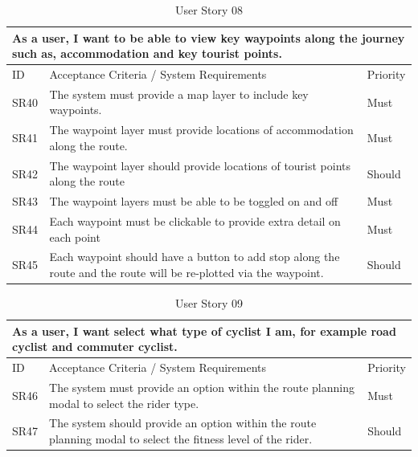 \begin{table}[!htb]
  \caption{User Story 08}
  \label{tab:user-story-08}
  \begin{tabular}{ m{1cm} m{11cm} m{1cm} }
  \hline
  \multicolumn{3}{p{13cm}}{As a user, I want to be able to view key waypoints along the journey such as, accommodation and key tourist points.}\\ 
  \hline
  ID & Acceptance Criteria / System Requirements & Priority\\
  \hline
  \label{SR:40}SR40 & The system must provide a map layer to include key waypoints. & Must \\
  \label{SR:41}SR41 & The waypoint layer must provide locations of accommodation along the route. & Must\\
  \label{SR:42}SR42 & The waypoint layer should provide locations of tourist points along the route & Should\\
  \label{SR:43}SR43 & The waypoint layers must be able to be toggled on and off & Must\\
  \label{SR:44}SR44 & Each waypoint must be clickable to provide extra detail on each point & Must\\
  \label{SR:45} SR45 & Each waypoint should have a button to add stop along the route and the route will be re-plotted via the waypoint. & Should\\
  \hline
  \end{tabular}
\end{table}

\begin{table}[!htb]
  \caption{User Story 09}
  \label{tab:user-story-09}
  \begin{tabular}{ m{1cm} m{11cm} m{1cm} }
  \hline
  \multicolumn{3}{p{13cm}}{As a user, I want select what type of cyclist I am, for example road cyclist and commuter cyclist.}\\ 
  \hline
  ID & Acceptance Criteria / System Requirements & Priority\\
  \hline
  \label{SR:46}SR46 & The system must provide an option within the route planning modal to select the rider type. & Must\\
  \label{SR:47}SR47 & The system should provide an option within the route planning modal to select the fitness level of the rider. & Should\\
  \hline
  \end{tabular}
\end{table}

